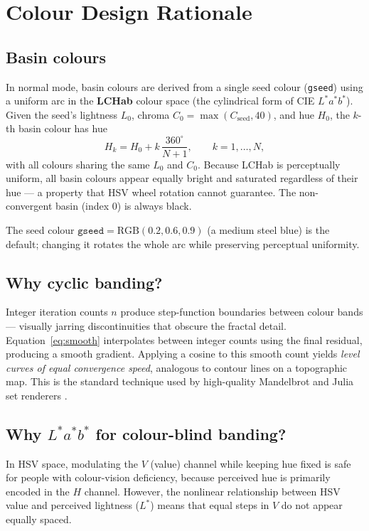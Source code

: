 \documentclass[11pt,a4paper]{article}
\theoremstyle{definition}
\newcommand{\opt}[1]{\texttt{#1}}
\begin{document}
\section{Colour Design Rationale}

\subsection{Basin colours}

In normal mode, basin colours are derived from a single seed colour
(\opt{gseed}) using a uniform arc in the \textbf{LCHab} colour space
(the cylindrical form of CIE $L^*a^*b^*$).
Given the seed's lightness $L_0$, chroma $C_0 = \max(C_{\mathrm{seed}},40)$,
and hue $H_0$, the $k$-th basin colour has hue
\[
  H_k = H_0 + k\,\frac{360^\circ}{N+1}, \qquad k = 1,\dots,N,
\]
with all colours sharing the same $L_0$ and $C_0$.
Because LCHab is perceptually uniform, all basin colours appear equally
bright and saturated regardless of their hue — a property that HSV
wheel rotation cannot guarantee.
The non-convergent basin (index $0$) is always black.

The seed colour $\mathtt{gseed} = \mathrm{RGB}(0.2, 0.6, 0.9)$ (a
medium steel blue) is the default; changing it rotates the whole arc
while preserving perceptual uniformity.

\subsection{Why cyclic banding?}

Integer iteration counts $n$ produce step-function boundaries between colour
bands — visually jarring discontinuities that obscure the fractal detail.
Equation~\eqref{eq:smooth} interpolates between integer counts using the
final residual, producing a smooth gradient.
Applying a cosine to this smooth count yields \emph{level curves of equal
convergence speed}, analogous to contour lines on a topographic map.
This is the standard technique used by high-quality Mandelbrot and Julia
set renderers \citep{linas2021}.

\subsection{Why $L^*a^*b^*$ for colour-blind banding?}

In HSV space, modulating the $V$ (value) channel while keeping hue fixed is
safe for people with colour-vision deficiency, because perceived hue is
primarily encoded in the $H$ channel.
However, the nonlinear relationship between HSV value and perceived
lightness ($L^*$) means that equal steps in $V$ do not appear equally spaced.
\end{document}
